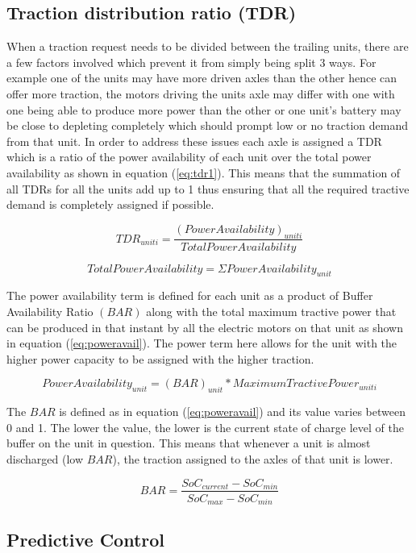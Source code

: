 \documentclass[ExampleMasters.tex]{subfiles}
\begin{document}
\subsection{Traction distribution ratio (TDR)} \label{sec:tdr}
When a traction request needs to be divided between the trailing units, there are a few factors involved which prevent it from simply being split 3 ways. For example one of the units may have more driven axles than the other hence can offer more traction, the motors driving the units axle may differ with one with one being able to produce more power than the other or one unit’s battery may be close to depleting completely which should prompt low or no traction demand from that unit. In order to address these issues each axle is assigned a TDR which is a ratio of the power availability of each unit over the total power availability as shown in equation (\ref{eq:tdr1}). This means that the summation of all TDRs for all the units add up to 1 thus ensuring that all the required tractive demand is completely assigned if possible. 

\begin{equation} \label{eq:tdr1}
TDR_{unit i}=\frac{(Power Availability)_{unit i}}{Total Power Availability}
\end{equation}
 
\begin{equation} \label{eq:tdr2}
Total Power Availability = \Sigma Power Availability_{unit}
\end{equation}

The power availability term is defined for each unit as a product of Buffer Availability Ratio $(BAR)$ along with the total maximum tractive power that can be produced in that instant by all the electric motors on that unit as shown in equation (\ref{eq:poweravail}). The power term here allows for the unit with the higher power capacity to be assigned with the higher traction.

\begin{equation} \label{eq:poweravail}
Power Availability_{unit} = (BAR)_{unit} * Maximum Tractive Power_{unit i}
\end{equation}
   
The $BAR$ is defined as in equation (\ref{eq:poweravail}) and its value varies between 0 and 1. The lower the value, the lower is the current state of charge level of the buffer on the unit in question. This means that whenever a unit is almost discharged (low $BAR$), the traction assigned to the axles of that unit is lower. 

\begin{equation} \label{eq:bar}
BAR = \frac{SoC_{current}-SoC_{min}}{SoC_{max}-SoC_{min}}
\end{equation}

\subsection{Predictive Control} \label{sec:predcontrol}
\end{document}
